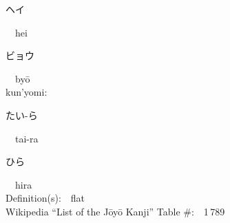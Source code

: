 \begin{multicols}{2}
{\hspace*{2em}}{\begin{CJK}{UTF8}{min} ヘイ \end{CJK}}\ \ hei\ \ \\
{\hspace*{2em}}{\begin{CJK}{UTF8}{min} ビョウ \end{CJK}}\ \ by\=o\ \ \\
{\hspace*{1em}}kun'yomi:\ \ \\
{\hspace*{2em}}{\begin{CJK}{UTF8}{min} たい-ら \end{CJK}}\ \ tai-ra\ \ \\
{\hspace*{2em}}{\begin{CJK}{UTF8}{min} ひら \end{CJK}}\ \ hira\ \ \\
Definition(s):\ \ flat \\
Wikipedia ``List of the J\=oy\=o Kanji'' Table \#:\ \ 1\,789 \\
\ \ \\
\end{multicols}



